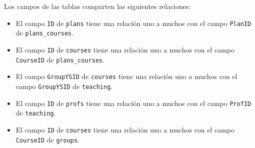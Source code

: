 \documentclass[twocolumn]{article}
\theoremstyle{definition}
\begin{document}
Los campos de las tablas comparten las siguientes relaciones:

\begin{itemize}
    \item El campo \texttt{ID} de \texttt{plans} tiene una relación uno a muchos con el campo \texttt{PlanID} de \texttt{plans\_courses}.
    
    \item El campo \texttt{ID} de \texttt{courses} tiene una relación uno a muchos con el campo \texttt{CourseID} de \texttt{plans\_courses}.
    
    \item El campo \texttt{GroupYSID} de \texttt{courses} tiene una relación uno a muchos con el campo \texttt{GroupYSID} de \texttt{teaching}.
    
    \item El campo \texttt{ID} de \texttt{profs} tiene una relación uno a muchos con el campo \texttt{ProfID} de \texttt{teaching}.
    
    \item El campo \texttt{ID} de \texttt{courses} tiene una relación uno a muchos con el campo \texttt{CourseID} de \texttt{groups}.
    
\end{itemize}

\onecolumn


\end{document}
